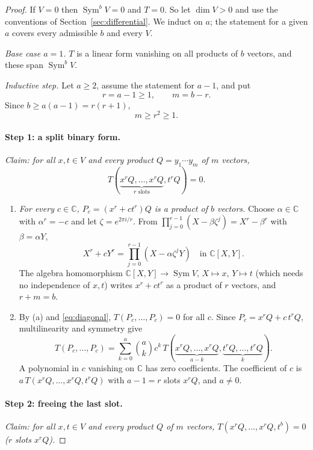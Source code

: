 \documentclass[11pt]{article}
\theoremstyle{remark}
\DeclareMathOperator{\Sym}{Sym}
\newcommand{\C}{\mathbb C}
\begin{document}
\begin{proof}
If $V=0$ then $\Sym^bV=0$ and $T=0$. So let $\dim V>0$ and use the
conventions of Section~\ref{sec:differential}. We induct on $a$; the
statement for a given $a$ covers every admissible $b$ and every $V$.

\emph{Base case $a=1$.} $T$ is a linear form vanishing on all products of
$b$ vectors, and these span $\Sym^bV$.

\emph{Inductive step.} Let $a\ge2$, assume the statement for $a-1$, and put
\begin{equation}\label{eq:rm}
 r=a-1\ge1,\qquad m=b-r.
\end{equation}
Since $b\ge a(a-1)=r(r+1)$,
\begin{equation}\label{eq:range}
 m\ge r^2\ge1.
\end{equation}

\paragraph{Step 1: a split binary form.}
\emph{Claim: for all $x,t\in V$ and every product $Q=y_1\cdots y_m$ of $m$
vectors,}
\begin{equation}\label{eq:binary}
 T(\underbrace{x^rQ,\ldots,x^rQ}_{r\text{ slots}},t^rQ)=0.
\end{equation}
\begin{enumerate}[label=(\alph*),nosep]
\item \emph{For every $c\in\C$, $P_c=(x^r+ct^r)Q$ is a product of $b$
vectors.} Choose $\alpha\in\C$ with $\alpha^r=-c$ and let
$\zeta=e^{2\pi i/r}$. From $\prod_{j=0}^{r-1}(X-\beta\zeta^j)=X^r-\beta^r$
with $\beta=\alpha Y$,
\[
 X^r+cY^r=\prod_{j=0}^{r-1}(X-\alpha\zeta^jY)\quad\text{in }\C[X,Y].
\]
The algebra homomorphism $\C[X,Y]\to\Sym V$, $X\mapsto x$, $Y\mapsto t$
(which needs no independence of $x,t$) writes $x^r+ct^r$ as a product of $r$
vectors, and $r+m=b$.
\item By (a) and \eqref{eq:diagonal}, $T(P_c,\ldots,P_c)=0$ for all $c$.
Since $P_c=x^rQ+c\,t^rQ$, multilinearity and symmetry give
\[
 T(P_c,\ldots,P_c)=\sum_{k=0}^{a}\binom ak c^k\,
 T(\underbrace{x^rQ,\ldots,x^rQ}_{a-k},\underbrace{t^rQ,\ldots,t^rQ}_{k}).
\]
A polynomial in $c$ vanishing on $\C$ has zero coefficients. The coefficient
of $c$ is $a\,T(x^rQ,\ldots,x^rQ,t^rQ)$ with $a-1=r$ slots $x^rQ$, and
$a\ne0$.
\end{enumerate}

\paragraph{Step 2: freeing the last slot.}
\emph{Claim: for all $x,t\in V$ and every product $Q$ of $m$ vectors,
$T(x^rQ,\ldots,x^rQ,t^b)=0$ ($r$ slots $x^rQ$).}


\end{proof}
\end{document}
